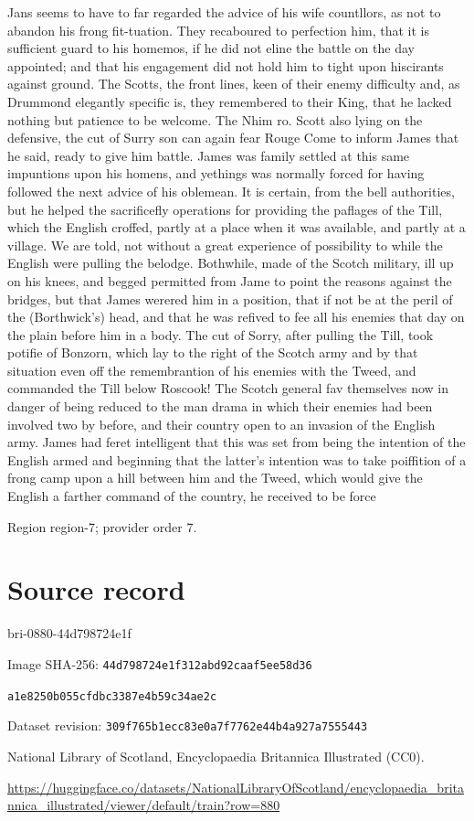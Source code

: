 \documentclass[11pt]{article}
\begin{document}
Jans seems to have to far regarded the advice of his wife countllors, as not to abandon his frong fit-tuation. They recaboured to perfection him, that it is sufficient guard to his homemos, if he did not eline the battle on the day appointed; and that his engagement did not hold him to tight upon hiscirants against ground. The Scotts, the front lines, keen of their enemy difficulty and, as Drummond elegantly specific is, they remembered to their King, that he lacked nothing but patience to be welcome. The Nhim ro. Scott also lying on the defensive, the cut of Surry son can again fear Rouge Come to inform James that he said, ready to give him battle. James was family settled at this same impuntions upon his homens, and yethings was normally forced for having followed the next advice of his oblemean. It is certain, from the bell authorities, but he helped the sacrificefly operations for providing the paflages of the Till, which the English croffed, partly at a place when it was available, and partly at a village. We are told, not without a great experience of possibility to while the English were pulling the belodge. Bothwhile, made of the Scotch military, ill up on his knees, and begged permitted from Jame to point the reasons against the bridges, but that James werered him in a position, that if not be at the peril of the (Borthwick’s) head, and that he was refived to fee all his enemies that day on the plain before him in a body. The cut of Sorry, after pulling the Till, took potifie of Bonzorn, which lay to the right of the Scotch army and by that situation even off the remembrantion of his enemies with the Tweed, and commanded the Till below Roscook! The Scotch general fav themselves now in danger of being reduced to the man drama in which their enemies had been involved two by before, and their country open to an invasion of the English army. James had feret intelligent that this was set from being the intention of the English armed and beginning that the latter’s intention was to take poiffition of a frong camp upon a hill between him and the Tweed, which would give the English a farther command of the country, he received to be force
\par

{\scriptsize\color{gray} Region region-7; provider order 7.\par}
\medskip
\newpage\section*{Source record}
bri-0880-44d798724e1f\par
Image SHA-256: \texttt{44d798724e1f312abd92caaf5ee58d36}\par\texttt{a1e8250b055cfdbc3387e4b59c34ae2c}\par
Dataset revision: \texttt{309f765b1ecc83e0a7f7}\texttt{762e44b4a927a7555443}\par
National Library of Scotland, Encyclopaedia Britannica Illustrated (CC0).\par
\url{https://huggingface.co/datasets/NationalLibraryOfScotland/encyclopaedia_britannica_illustrated/viewer/default/train?row=880}
\end{document}
